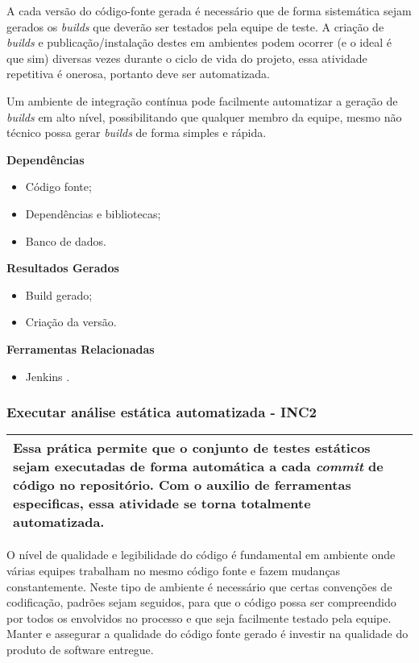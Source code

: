 A cada versão do código-fonte gerada é necessário que de forma sistemática sejam gerados os \textit{builds} que deverão ser testados pela equipe de teste. A criação de \textit{builds} e publicação/instalação destes em ambientes podem ocorrer (e o ideal é que sim) diversas vezes durante o ciclo de vida do projeto, essa atividade repetitiva é onerosa, portanto deve ser automatizada.

Um ambiente de integração contínua pode facilmente automatizar a geração de \textit{builds} em alto nível, possibilitando que qualquer membro da equipe, mesmo não técnico possa gerar \textit{builds} de forma simples e rápida.

\textbf{Dependências}
\begin{itemize}
    \item Código fonte;
    \item Dependências e bibliotecas;
    \item Banco de dados.
\end{itemize}

\textbf{ Resultados Gerados }
\begin{itemize}
    \item Build gerado;
    \item Criação da versão.
\end{itemize}

\textbf{ Ferramentas Relacionadas }
\begin{itemize}
    \item Jenkins \cite{Jenkins}.
\end{itemize}

\subsubsection{Executar análise estática automatizada - INC2}
\label{sec:inc2}

\begin{table}[!ht]
\centering
\begin{tabular}{|p{130mm}|}
\hline
Essa prática permite que o conjunto de testes estáticos sejam executadas de forma automática a cada \textit{commit} de código no repositório. Com o auxilio de ferramentas especificas, essa atividade se torna totalmente automatizada. \\ 
\hline
\end{tabular}
\end{table}

O nível de qualidade e legibilidade do código é fundamental em ambiente onde várias equipes trabalham no mesmo código fonte e fazem mudanças constantemente. Neste tipo de ambiente é necessário que certas convenções de codificação, padrões sejam seguidos, para que o código possa ser compreendido por todos os envolvidos no processo e que seja facilmente testado pela equipe. Manter e assegurar a qualidade do código fonte gerado é investir na qualidade do produto de software entregue.

